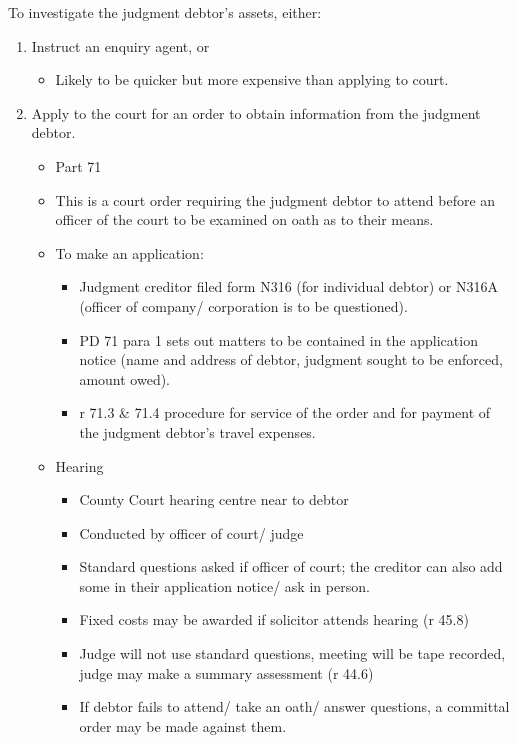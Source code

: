 \documentclass[
]{article}
\providecommand{\tightlist}{%
  \setlength{\itemsep}{0pt}\setlength{\parskip}{0pt}}
\begin{document}
To investigate the judgment debtor's assets, either:

\begin{enumerate}
\def\labelenumi{\arabic{enumi}.}
\tightlist
\item
  Instruct an enquiry agent, or

  \begin{itemize}
  \tightlist
  \item
    Likely to be quicker but more expensive than applying to court.
  \end{itemize}
\item
  Apply to the court for an order to obtain information from the
  judgment debtor.

  \begin{itemize}
  \tightlist
  \item
    Part 71
  \item
    This is a court order requiring the judgment debtor to attend before
    an officer of the court to be examined on oath as to their means.
  \item
    To make an application:

    \begin{itemize}
    \tightlist
    \item
      Judgment creditor filed form N316 (for individual debtor) or N316A
      (officer of company/ corporation is to be questioned).
    \item
      PD 71 para 1 sets out matters to be contained in the application
      notice (name and address of debtor, judgment sought to be
      enforced, amount owed).
    \item
      r 71.3 \& 71.4 procedure for service of the order and for payment
      of the judgment debtor's travel expenses.
    \end{itemize}
  \item
    Hearing

    \begin{itemize}
    \tightlist
    \item
      County Court hearing centre near to debtor
    \item
      Conducted by officer of court/ judge
    \item
      Standard questions asked if officer of court; the creditor can
      also add some in their application notice/ ask in person.
    \item
      Fixed costs may be awarded if solicitor attends hearing (r 45.8)
    \item
      Judge will not use standard questions, meeting will be tape
      recorded, judge may make a summary assessment (r 44.6)
    \item
      If debtor fails to attend/ take an oath/ answer questions, a
      committal order may be made against them.
    \end{itemize}
  \end{itemize}
\end{enumerate}
\end{document}
